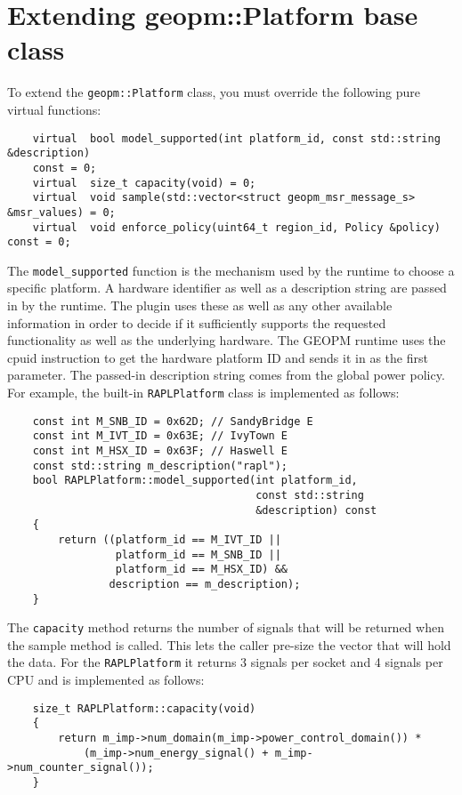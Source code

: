 \documentclass[11pt]{article}
\begin{document}
\section{Extending geopm::Platform base class}
To extend the \verb#geopm::Platform# class, you must override the
following pure virtual functions:
\begin{verbatim}
    virtual  bool model_supported(int platform_id, const std::string &description)
    const = 0;
    virtual  size_t capacity(void) = 0;
    virtual  void sample(std::vector<struct geopm_msr_message_s> &msr_values) = 0;
    virtual  void enforce_policy(uint64_t region_id, Policy &policy) const = 0;
\end{verbatim}
The \verb#model_supported# function is the mechanism used by the
runtime to choose a specific platform. A hardware identifier as
well as a description string are passed in by the runtime.  The plugin
uses these as well as any other available information in order to
decide if it sufficiently supports the requested functionality as well
as the underlying hardware. The GEOPM runtime uses the cpuid
instruction to get the hardware platform ID and sends it in as the
first parameter. The passed-in description string comes from the
global power policy. For example, the built-in \verb#RAPLPlatform#
class is implemented as follows:
\begin{verbatim}
    const int M_SNB_ID = 0x62D; // SandyBridge E
    const int M_IVT_ID = 0x63E; // IvyTown E
    const int M_HSX_ID = 0x63F; // Haswell E
    const std::string m_description("rapl");
    bool RAPLPlatform::model_supported(int platform_id,
                                       const std::string
                                       &description) const
    {
        return ((platform_id == M_IVT_ID ||
                 platform_id == M_SNB_ID ||
                 platform_id == M_HSX_ID) &&
                description == m_description);
    }
\end{verbatim}
The \verb#capacity# method returns the number of signals that will be
returned when the sample method is called. This lets the caller
pre-size the vector that will hold the data. For the
\verb#RAPLPlatform# it returns 3 signals per socket and 4 signals per
CPU and is implemented as follows:
\begin{verbatim}
    size_t RAPLPlatform::capacity(void)
    {
        return m_imp->num_domain(m_imp->power_control_domain()) *
            (m_imp->num_energy_signal() + m_imp->num_counter_signal());
    }
\end{verbatim}
\end{document}
